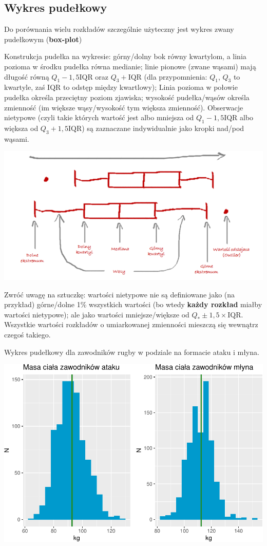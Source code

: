 \documentclass[
  openany]{book}
\begin{document}
\hypertarget{wykres-pudeux142kowy}{%
\subsection{Wykres pudełkowy}\label{wykres-pudeux142kowy}}

Do porównania wielu rozkładów szczególnie użyteczny jest wykres zwany pudełkowym (\textbf{box-plot})

Konstrukcja pudełka na wykresie:
górny/dolny bok równy kwartylom, a linia pozioma w środku pudełka równa medianie;
linie pionowe (zwane wąsami) mają długość równą \(Q_1 - 1,5 \textrm{IQR}\)
oraz \(Q_3 + \textrm{IQR}\) (dla przypomnienia: \(Q_1\), \(Q_3\) to kwartyle, zaś \(\textrm{IQR}\) to odstęp między kwartlowy); Linia pozioma w połowie pudełka określa przeciętny poziom zjawiska; wysokość pudełka/wąsów
określa zmienność (im większe wąsy/wysokość tym większa zmienność).
Obserwacje nietypowe (czyli takie których wartość jest albo mniejsza od \(Q_1 - 1,5\textrm{IQR}\)
albo większa od \(Q_3 + 1,5\textrm{IQR}\)) są zaznaczane indywidualnie jako kropki nad/pod wąsami.

\includegraphics{./box-plot-0.jpg}

Zwróć uwagę na sztuczkę: wartości nietypowe nie są definiowane jako (na przykład) górne/dolne
1\% wszystkich wartości (bo wtedy \textbf{każdy rozkład} miałby wartości nietypowe);
ale jako wartości mniejsze/większe od \(Q_* \pm 1,5 \times \mathrm{IQR}\).
Wszystkie wartości rozkładów o umiarkowanej zmienności mieszczą się wewnątrz czegoś takiego.

Wykres pudełkowy dla zawodników rugby w podziale na formacie ataku i młyna.

\includegraphics{_main_files/figure-latex/unnamed-chunk-18-1.pdf}
\end{document}
